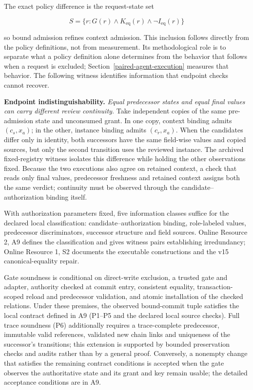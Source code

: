 \documentclass[pdflatex,sn-basic]{sn-jnl}
\begin{document}
The exact policy difference is the request-state set

\[
S = \{r : G(r) \land  K_{\mathrm{eq}}(r) \land  \neg I_{\mathrm{eq}}(r)\}
\]

so bound admission refines context admission. This inclusion follows directly from the policy definitions, not from measurement. Its methodological role is to separate what a policy definition alone determines from the behavior that follows when a request is excluded; Section~\ref{paired-agent-execution} measures that behavior. The following witness identifies information that endpoint checks cannot recover.

\textbf{Endpoint indistinguishability.} \emph{Equal predecessor states and equal final values can carry different review continuity.} Take independent copies of the same pre-admission state and unconsumed grant. In one copy, context binding admits \((c_s,x_a)\); in the other, instance binding admits \((c_r,x_a)\). When the candidates differ only in identity, both successors have the same field-wise values and copied sources, but only the second transition uses the reviewed instance. The archived fixed-registry witness isolates this difference while holding the other observations fixed. Because the two executions also agree on retained context, a check that reads only final values, predecessor freshness and retained context assigns both the same verdict; continuity must be observed through the candidate--authorization binding itself.

With authorization parameters fixed, five information classes suffice for the declared local classification: candidate--authorization binding, role-labeled values, predecessor discriminators, successor structure and field sources. Online Resource 2, A9 defines the classification and gives witness pairs establishing irredundancy; Online Resource 1, S2 documents the executable constructions and the v15 canonical-equality repair.

Gate soundness is conditional on direct-write exclusion, a trusted gate and adapter, authority checked at commit entry, consistent equality, transaction-scoped reload and predecessor validation, and atomic installation of the checked relations. Under these premises, the observed bound-commit tuple satisfies the local contract defined in A9 (P1--P5 and the declared local source checks). Full trace soundness (P6) additionally requires a trace-complete predecessor, immutable valid references, validated new chain links and uniqueness of the successor's transitions; this extension is supported by bounded preservation checks and audits rather than by a general proof. Conversely, a nonempty change that satisfies the remaining contract conditions is accepted when the gate observes the authoritative state and its grant and key remain usable; the detailed acceptance conditions are in A9.
\end{document}
